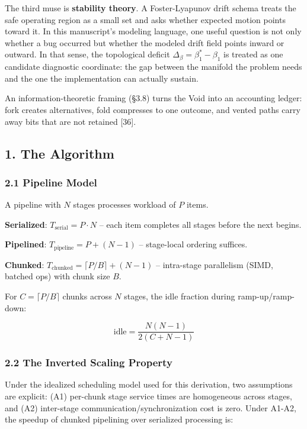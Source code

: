 \documentclass[
  11pt,
]{article}
\begin{document}
The third muse is \textbf{stability theory}. A Foster-Lyapunov drift
schema treats the safe operating region as a small set and asks whether
expected motion points toward it. In this manuscript's modeling
language, one useful question is not only whether a bug occurred but
whether the modeled drift field points inward or outward. In that sense,
the topological deficit \(\Delta_\beta = \beta_1^* - \beta_1\) is
treated as one candidate diagnostic coordinate: the gap between the
manifold the problem needs and the one the implementation can actually
sustain.

An information-theoretic framing (§3.8) turns the Void into an
accounting ledger: fork creates alternatives, fold compresses to one
outcome, and vented paths carry away bits that are not retained
{[}36{]}.

\subsection{1. The Algorithm}\label{the-algorithm}

\subsubsection{2.1 Pipeline Model}\label{pipeline-model}

A pipeline with \(N\) stages processes workload of \(P\) items.

\textbf{Serialized}: \(T_{\text{serial}} = P \cdot N\) -- each item
completes all stages before the next begins.

\textbf{Pipelined}: \(T_{\text{pipeline}} = P + (N - 1)\) -- stage-local
ordering suffices.

\textbf{Chunked}: \(T_{\text{chunked}} = \lceil P/B \rceil + (N - 1)\)
-- intra-stage parallelism (SIMD, batched ops) with chunk size \(B\).

For \(C = \lceil P/B \rceil\) chunks across \(N\) stages, the idle
fraction during ramp-up/ramp-down:

\[
\text{idle} = \frac{N(N-1)}{2(C + N - 1)}
\]

\subsubsection{2.2 The Inverted Scaling
Property}\label{the-inverted-scaling-property}

Under the idealized scheduling model used for this derivation, two
assumptions are explicit: (A1) per-chunk stage service times are
homogeneous across stages, and (A2) inter-stage
communication/synchronization cost is zero. Under A1-A2, the speedup of
chunked pipelining over serialized processing is:
\end{document}
